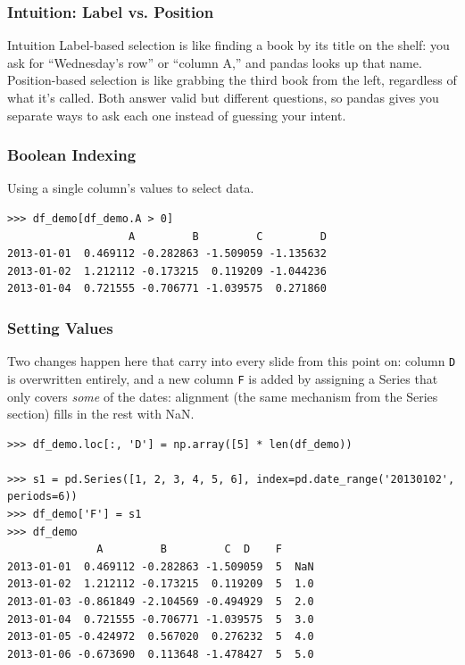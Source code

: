 \begin{frame}[fragile]\frametitle{Intuition: Label vs. Position}
\begin{block}{Intuition}
Label-based selection is like finding a book by its title on the shelf: you ask for
``Wednesday's row'' or ``column A,'' and pandas looks up that name. Position-based selection is
like grabbing the third book from the left, regardless of what it's called. Both answer valid
but different questions, so pandas gives you separate ways to ask each one instead of guessing
your intent.
\end{block}
\end{frame}

\begin{frame}[fragile]\frametitle{Boolean Indexing}
Using a single column's values to select data.
\begin{lstlisting}
>>> df_demo[df_demo.A > 0]
                   A         B         C         D
2013-01-01  0.469112 -0.282863 -1.509059 -1.135632
2013-01-02  1.212112 -0.173215  0.119209 -1.044236
2013-01-04  0.721555 -0.706771 -1.039575  0.271860
\end{lstlisting}
\end{frame}

\begin{frame}[fragile]\frametitle{Setting Values}
Two changes happen here that carry into every slide from this point on: column \texttt{D} is
overwritten entirely, and a new column \texttt{F} is added by assigning a Series that only
covers \emph{some} of the dates: alignment (the same mechanism from the Series section) fills
in the rest with NaN.
\begin{lstlisting}
>>> df_demo.loc[:, 'D'] = np.array([5] * len(df_demo))

>>> s1 = pd.Series([1, 2, 3, 4, 5, 6], index=pd.date_range('20130102', periods=6))
>>> df_demo['F'] = s1
>>> df_demo
              A         B         C  D    F
2013-01-01  0.469112 -0.282863 -1.509059  5  NaN
2013-01-02  1.212112 -0.173215  0.119209  5  1.0
2013-01-03 -0.861849 -2.104569 -0.494929  5  2.0
2013-01-04  0.721555 -0.706771 -1.039575  5  3.0
2013-01-05 -0.424972  0.567020  0.276232  5  4.0
2013-01-06 -0.673690  0.113648 -1.478427  5  5.0
\end{lstlisting}
\end{frame}

